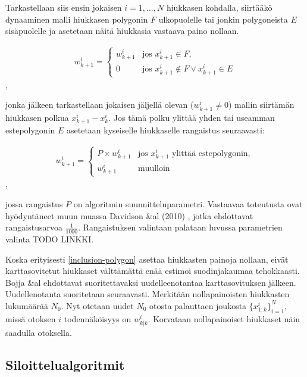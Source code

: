 \documentclass[
  12pt,
  a4paper, twoside]{book}
\begin{document}
Tarkastellaan siis ensin jokaisen \(i=1,\ldots,N\) hiukkasen kohdalla, siirtääkö dynaaminen malli hiukkasen polygonin \(F\) ulkopuolelle tai jonkin polygoneista \(E\) sisäpuolelle ja asetetaan näitä hiukkasia vastaava paino nollaan.

\begin{align}\label{inclusion-polygon}
\displaystyle w^i_{k+1}={\begin{cases}w^i_{k+1}&\text{jos } x^i_{k+1} \in F,\\
0& \text{jos } x^i_{k+1} \notin F \lor x^i_{k+1} \in E \end{cases}}\end{align},

jonka jälkeen tarkastellaan jokaisen jäljellä olevan (\(w^i_{k+1} \neq 0\)) mallin siirtämän hiukkasen polkua \(x_{k+1}^i-x_{k}^i\). Jos tämä polku ylittää yhden tai useamman estepolygonin \(E\) asetetaan kyseiselle hiukkaselle rangaistus seuraavasti:

\begin{align}\label{exclusion-polygon}
\displaystyle w^i_{k+1}={\begin{cases}P \times w^i_{k+1}&\text{jos } x^i_{k+1} \text{ ylittää estepolygonin},\\
w^i_{k+1}& \text{muulloin }\end{cases}}\end{align},

jossa rangaistus \(P\) on algoritmin suunnitteluparametri. Vastaavaa toteutusta ovat hyödyntäneet muun muassa Davidson \&al (2010) \citep{Davidson-2010}, jotka ehdottavat rangaistusarvoa \(\frac{1}{1000}\). Rangaistuksen valintaan palataan luvussa parametrien valinta TODO LINKKI.

Koska erityisesti \ref{inclusion-polygon} asettaa hiukkasten painoja nollaan, eivät karttasovitetut hiukkaset välttämättä enää estimoi suodinjakaumaa tehokkaasti. Bojja \&al \citep{Bojja-2015} ehdottavat suoritettavaksi uudelleenotantaa karttasovituksen jälkeen. Uudellenotanta suoritetaan seuraavasti. Merkitään nollapainoisten hiukkasten lukumäärää \(N_0\). Nyt otetaan uudet \(N_0\) otosta palauttaen joukosta \(\{x_{1:k}^i\}_{i=1}^N\), missä otoksen \(i\) todennäköisyys on \(w^i_{k|k}\). Korvataan nollapainoiset hiukkaset näin saadulla otoksella.

\hypertarget{siloittelualgoritmit}{%
\subsection{Siloittelualgoritmit}\label{siloittelualgoritmit}}
\end{document}
